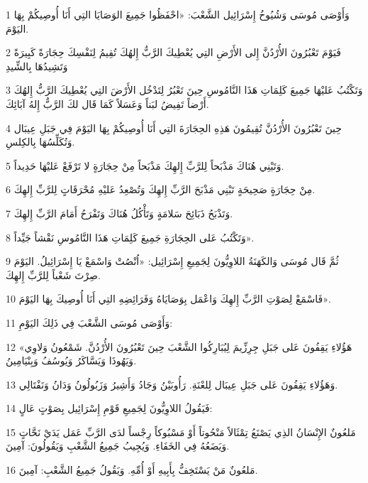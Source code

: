 \par 1 وَأَوْصَى مُوسَى وَشُيُوخُ إِسْرَائِيل الشَّعْبَ: «احْفَظُوا جَمِيعَ الوَصَايَا التِي أَنَا أُوصِيكُمْ بِهَا اليَوْمَ.
\par 2 فَيَوْمَ تَعْبُرُونَ الأُرْدُنَّ إِلى الأَرْضِ التِي يُعْطِيكَ الرَّبُّ إِلهُكَ تُقِيمُ لِنَفْسِكَ حِجَارَةً كَبِيرَةً وَتَشِيدُهَا بِالشِّيدِ
\par 3 وَتَكْتُبُ عَليْهَا جَمِيعَ كَلِمَاتِ هَذَا النَّامُوسِ حِينَ تَعْبُرُ لِتَدْخُل الأَرْضَ التِي يُعْطِيكَ الرَّبُّ إِلهُكَ أَرْضاً تَفِيضُ لبَناً وَعَسَلاً كَمَا قَال لكَ الرَّبُّ إِلهُ آبَائِكَ.
\par 4 حِينَ تَعْبُرُونَ الأُرْدُنَّ تُقِيمُونَ هَذِهِ الحِجَارَةَ التِي أَنَا أُوصِيكُمْ بِهَا اليَوْمَ فِي جَبَلِ عِيبَال وَتُكَلِّسُهَا بِالكِلسِ.
\par 5 وَتَبْنِي هُنَاكَ مَذْبَحاً لِلرَّبِّ إِلهِكَ مَذْبَحاً مِنْ حِجَارَةٍ لا تَرْفَعْ عَليْهَا حَدِيداً.
\par 6 مِنْ حِجَارَةٍ صَحِيحَةٍ تَبْنِي مَذْبَحَ الرَّبِّ إِلهِكَ وَتُصْعِدُ عَليْهِ مُحْرَقَاتٍ لِلرَّبِّ إِلهِكَ.
\par 7 وَتَذْبَحُ ذَبَائِحَ سَلامَةٍ وَتَأْكُلُ هُنَاكَ وَتَفْرَحُ أَمَامَ الرَّبِّ إِلهِكَ.
\par 8 وَتَكْتُبُ عَلى الحِجَارَةِ جَمِيعَ كَلِمَاتِ هَذَا النَّامُوسِ نَقْشاً جَيِّداً».
\par 9 ثُمَّ قَال مُوسَى وَالكَهَنَةُ اللاوِيُّونَ لِجَمِيعِ إِسْرَائِيل: «اُنْصُتْ وَاسْمَعْ يَا إِسْرَائِيلُ. اليَوْمَ صِرْتَ شَعْباً لِلرَّبِّ إِلهِكَ.
\par 10 فَاسْمَعْ لِصَوْتِ الرَّبِّ إِلهِكَ وَاعْمَل بِوَصَايَاهُ وَفَرَائِضِهِ التِي أَنَا أُوصِيكَ بِهَا اليَوْمَ».
\par 11 وَأَوْصَى مُوسَى الشَّعْبَ فِي ذَلِكَ اليَوْمِ:
\par 12 «هَؤُلاءِ يَقِفُونَ عَلى جَبَلِ جِرِزِّيمَ لِيُبَارِكُوا الشَّعْبَ حِينَ تَعْبُرُونَ الأُرْدُنَّ. شَمْعُونُ وَلاوِي وَيَهُوذَا وَيَسَّاكَرُ وَيُوسُفُ وَبِنْيَامِينُ.
\par 13 وَهَؤُلاءِ يَقِفُونَ عَلى جَبَلِ عِيبَال لِلعْنَةِ. رَأُوبَيْنُ وَجَادُ وَأَشِيرُ وَزَبُولُونُ وَدَانُ وَنَفْتَالِي.
\par 14 فَيَقُولُ اللاوِيُّونَ لِجَمِيعِ قَوْمِ إِسْرَائِيل بِصَوْتٍ عَالٍ:
\par 15 مَلعُونٌ الإِنْسَانُ الذِي يَصْنَعُ تِمْثَالاً مَنْحُوتاً أَوْ مَسْبُوكاً رِجْساً لدَى الرَّبِّ عَمَل يَدَيْ نَحَّاتٍ وَيَضَعُهُ فِي الخَفَاءِ. وَيُجِيبُ جَمِيعُ الشَّعْبِ وَيَقُولُونَ: آمِينَ.
\par 16 مَلعُونٌ مَنْ يَسْتَخِفُّ بِأَبِيهِ أَوْ أُمِّهِ. وَيَقُولُ جَمِيعُ الشَّعْبِ: آمِينَ.
